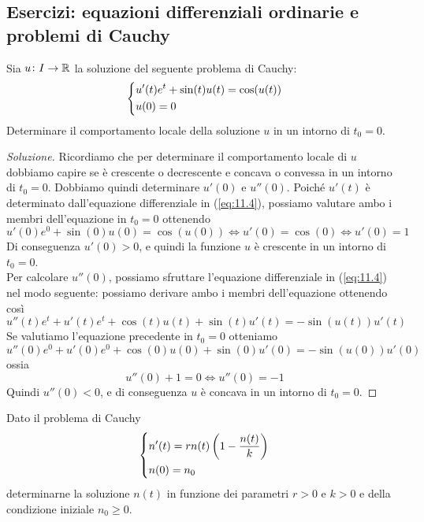 \subsection{Esercizi: equazioni differenziali ordinarie e problemi di Cauchy}
\begin{exercise}
    \label{ex:11.1}
    Sia $u\colon I \to\amsbb{R}$ la soluzione del seguente problema di Cauchy:
    \begin{equation}
        \label{eq:11.4}
        \begin{dcases}
            u'(t)e^t +\sin(t)u(t) = \cos(u(t))\\
            u(0) = 0
        \end{dcases}
    \end{equation}
    Determinare il comportamento locale della soluzione $u$ in un intorno di $t_0=0$.
\end{exercise}
\begin{proof}[Soluzione]
    Ricordiamo che per determinare il comportamento locale di $u$ dobbiamo capire se è crescente o decrescente e concava o convessa in un intorno di $t_0=0$. Dobbiamo quindi determinare $u'(0)$ e $u''(0)$. Poiché $u'(t)$ è determinato dall'equazione differenziale in (\ref{eq:11.4}), possiamo valutare ambo i membri dell'equazione in $t_0=0$ ottenendo
    \[
    u'(0)e^0 +\sin(0)u(0)=\cos(u(0)) \iff u'(0) = \cos(0) \iff u'(0) = 1
    \]
    Di conseguenza $u'(0)>0$, e quindi la funzione $u$ è crescente in un intorno di $t_0=0$.\\
    Per calcolare $u''(0)$, possiamo sfruttare l'equazione differenziale in (\ref{eq:11.4}) nel modo seguente: possiamo derivare ambo i membri dell'equazione ottenendo così
    \[
    u''(t)e^t + u'(t)e^t + \cos(t)u(t) + \sin(t)u'(t) = -\sin(u(t))u'(t)
    \]
    Se valutiamo l'equazione precedente in $t_0=0$ otteniamo
    \[
    u''(0) e^0 +u'(0)e^0 +\cos(0)u(0)+\sin(0)u'(0) = -\sin(u(0))u'(0) 
    \]
    ossia
    \[
    u''(0) + 1 = 0 \iff u''(0)=-1
    \]
    Quindi $u''(0)<0$, e di conseguenza $u$ è concava in un intorno di $t_0=0$.
\end{proof}
\begin{exercise}
    \label{ex:11.2}
    Dato il problema di Cauchy
    \begin{equation}
        \label{eq:11.5}
        \begin{dcases}
            n'(t) = r n(t)\left(1-\frac{n(t)}{k}\right)\\
            n(0) = n_0
    \end{dcases}
    \end{equation}
    determinarne la soluzione $n(t)$ in funzione dei parametri $r>0$ e $k>0$ e della condizione iniziale $n_0\ge 0$.
\end{exercise}
